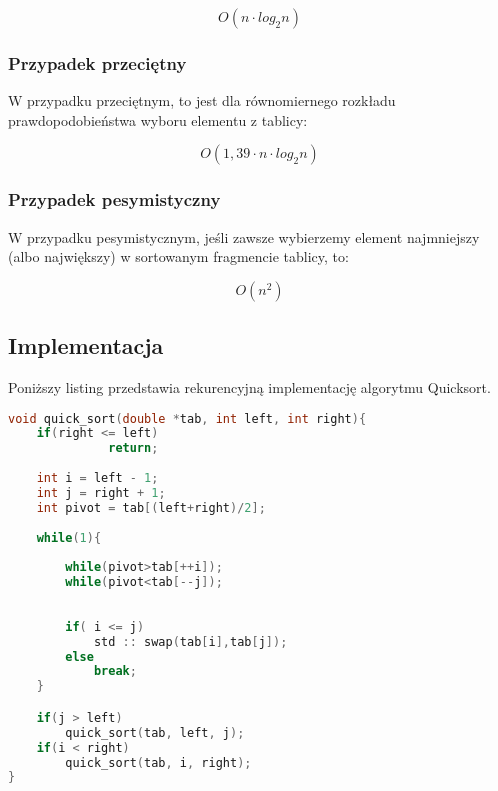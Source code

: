 \documentclass[12pt]{article}
\begin{document}
{ \Large \begin{equation*}
       O(n \cdot log_2 n)  
\end{equation*}}
\subsubsection{Przypadek przeciętny}\label{ch: q przecietny}
W przypadku przeciętnym, to jest dla równomiernego rozkładu prawdopodobieństwa wyboru elementu z tablicy: 


{ \Large \begin{equation*}
       O(1,39 \cdot n \cdot log_2 n )  
\end{equation*}}

\subsubsection{Przypadek pesymistyczny}
W przypadku pesymistycznym, jeśli zawsze wybierzemy element najmniejszy (albo największy) w sortowanym fragmencie tablicy, to: 


{\Large \begin{equation*}
       O\left({n^2}\right)  
\end{equation*}}

\subsection{Implementacja}
Poniższy listing przedstawia rekurencyjną implementację algorytmu Quicksort. 

{\small \begin{lstlisting}[language=C++]
void quick_sort(double *tab, int left, int right){
	if(right <= left) 
              return;
	
	int i = left - 1;
    int j = right + 1; 
    int pivot = tab[(left+right)/2]; 
	
	while(1){
		
		while(pivot>tab[++i]);
		while(pivot<tab[--j]);
		
		
		if( i <= j)
			std :: swap(tab[i],tab[j]);
		else
			break;
	}

	if(j > left)
	    quick_sort(tab, left, j);
	if(i < right)
	    quick_sort(tab, i, right);
}
\end{lstlisting}
}
\end{document}
